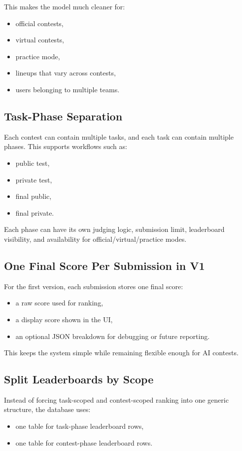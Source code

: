 \documentclass[11pt,a4paper]{article}
\begin{document}
This makes the model much cleaner for:
\begin{itemize}
    \item official contests,
    \item virtual contests,
    \item practice mode,
    \item lineups that vary across contests,
    \item users belonging to multiple teams.
\end{itemize}

\subsection{Task-Phase Separation}
Each contest can contain multiple tasks, and each task can contain multiple phases. This supports workflows such as:
\begin{itemize}
    \item public test,
    \item private test,
    \item final public,
    \item final private.
\end{itemize}

Each phase can have its own judging logic, submission limit, leaderboard visibility, and availability for official/virtual/practice modes.

\subsection{One Final Score Per Submission in V1}
For the first version, each submission stores one final score:
\begin{itemize}
    \item a raw score used for ranking,
    \item a display score shown in the UI,
    \item an optional JSON breakdown for debugging or future reporting.
\end{itemize}

This keeps the system simple while remaining flexible enough for AI contests.

\subsection{Split Leaderboards by Scope}
Instead of forcing task-scoped and contest-scoped ranking into one generic structure, the database uses:
\begin{itemize}
    \item one table for task-phase leaderboard rows,
    \item one table for contest-phase leaderboard rows.
\end{itemize}
\end{document}
